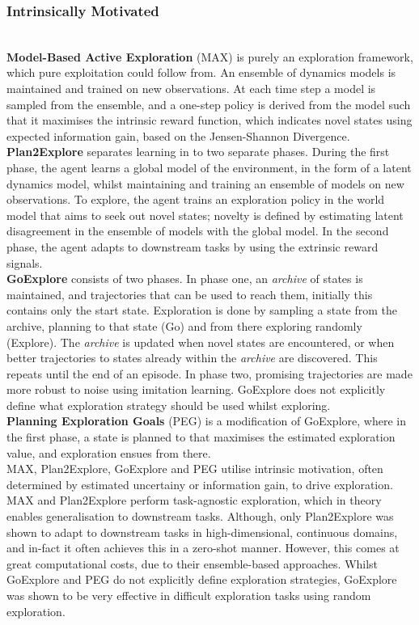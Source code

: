 \subsubsection{Intrinsically Motivated}
\\\textbf{Model-Based Active Exploration} (MAX) \cite{DBLP:journals/corr/abs-1810-12162} is purely an exploration framework, which pure exploitation could follow from. An ensemble of dynamics models is maintained and trained on new observations. At each time step a model is sampled from the ensemble, and a one-step policy is derived from the model such that it maximises the intrinsic reward function, which indicates novel states using expected information gain, based on the Jensen-Shannon Divergence.
\\ \textbf{Plan2Explore} \cite{plan2explore} separates learning in to two separate phases. During the first phase, the agent learns a global model of the environment, in the form of a latent dynamics model, whilst maintaining and training an ensemble of models on new observations. To explore, the agent trains an exploration policy in the world model that aims to seek out novel states; novelty is defined by estimating latent disagreement in the ensemble of models with the global model. In the second phase, the agent adapts to downstream tasks by using the extrinsic reward signals.
\\ \textbf{GoExplore} \cite{goexplore} consists of two phases. In phase one, an \textit{archive} of states is maintained, and trajectories that can be used to reach them, initially this contains only the start state. Exploration is done by sampling a state from the archive, planning to that state (Go) and from there exploring randomly (Explore). The \textit{archive} is updated when novel states are encountered, or when better trajectories to states already within the \textit{archive} are discovered. This repeats until the end of an episode. In phase two, promising trajectories are made more robust to noise using imitation learning. GoExplore does not explicitly define what exploration strategy should be used whilst exploring.
\\ \textbf{Planning Exploration Goals} (PEG) \cite{hu2023planning} is a modification of GoExplore, where in the first phase, a state is planned to that maximises the estimated exploration value, and exploration ensues from there.
\\ MAX, Plan2Explore, GoExplore and PEG utilise intrinsic motivation, often determined by estimated uncertainy or information gain, to drive exploration. MAX and Plan2Explore perform task-agnostic exploration, which in theory enables generalisation to downstream tasks. Although, only Plan2Explore was shown to adapt to downstream tasks in high-dimensional, continuous domains, and in-fact it often achieves this in a zero-shot manner. However, this comes at great computational costs, due to their ensemble-based approaches.
Whilst GoExplore and PEG do not explicitly define exploration strategies, GoExplore was shown to be very effective in difficult exploration tasks using random exploration.

